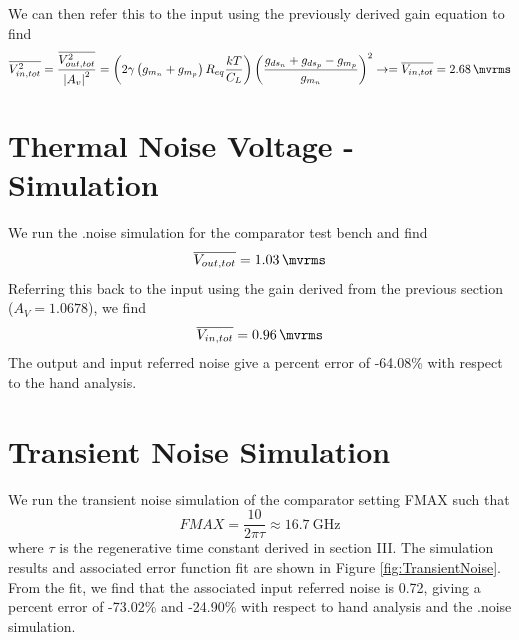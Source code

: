 \documentclass[letterpaper, notitlepage]{revtex4-1}
\begin{document}
 We can then refer this to the input using the previously derived gain equation to find
\begin{equation}
\overline{V^2_{in,tot}}=\frac{\overline{V_{out,tot}^2}}{\left|A_v\right|^2}=\left(2\gamma\left(g_{m_n}+g_{m_p}\right)R_{eq}\frac{kT}{C_L}\right)\left(\frac{g_{ds_{n}}+g_{ds_{p}}-g_{m_p}}{g_{m_n}}\right)^2\rightarrow=\overline{V_{in,tot}}=\SI{2.68}{\mvrms}
\end{equation}

\section{Thermal Noise Voltage - Simulation}
We run the .noise simulation for the comparator test bench and find
\begin{equation}
\overline{V_{out,tot}}=\SI{1.03}{\mvrms}
\end{equation}
Referring this back to the input using the gain derived from the previous section ($A_V=1.0678$), we find
\begin{equation}
\overline{V_{in,tot}}=\SI{0.96}{\mvrms}
\end{equation}
The output and input referred noise give a percent error of -64.08\% with respect to the hand analysis. 

\section{Transient Noise Simulation}
We run the transient noise simulation of the comparator setting FMAX such that
\begin{equation}
FMAX=\frac{10}{2\pi\tau}\approx\SI{16.7}{\giga\hertz}
\end{equation}
where $\tau$ is the regenerative time constant derived in section III. The simulation results and associated error function fit are shown in Figure \ref{fig:TransientNoise}. From the fit, we find that the associated input referred noise is \SI{0.72}{\mvrms}, giving a percent error of -73.02\% and -24.90\% with respect to hand analysis and the .noise simulation.
\end{document}
